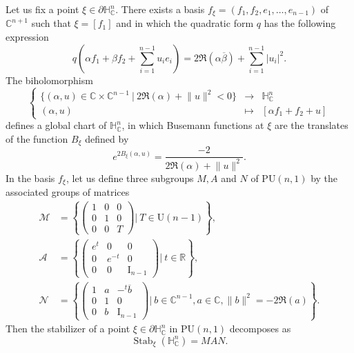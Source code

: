 \documentclass{article}
\theoremstyle{definition}
\theoremstyle{remark}
\newcommand{\C}{\mathbb{C}}
\newcommand{\R}{\mathbb{R}}
\newcommand{\HNC}{\mathbb{H}^{n}_{\C}}
\newcommand{\PHNC}{\partial\mathbb{H}^{n}_{\C}}
\newcommand{\PU}{\mathrm{PU}}
\begin{document}
	Let us fix a point $\xi\in\PHNC$. There exists a basis $f_{\xi}=(f_1,f_2,e_1,\dots,e_{n-1})$ of $\C^{n+1}$ such that $\xi=[f_1]$ and in which the quadratic form $q$ has the following expression\begin{equation*}
		q\left(\alpha f_1+\beta f_2+\sum_{i=1}^{n-1}u_ie_i\right) = 2\Re(\alpha\overline{\beta}) + \sum_{i=1}^{n-1}\lvert u_i\rvert^{2}.
	\end{equation*}
	The biholomorphism 
	\begin{equation*}
		\left\{\begin{array}{rcl}
			\{(\alpha,u)\in \C\times\C^{n-1}\ \vert \ 2\Re(\alpha)+\lVert u\rVert^{2}<0\} &\longrightarrow &\HNC\\
			(\alpha,u) &\longmapsto & [\alpha f_1+f_2+u]
		\end{array}	\right.
	\end{equation*}
	defines a global chart of $\HNC$, in which Busemann functions at $\xi$ are the translates of the function $B_{\xi}$ defined by
	\begin{equation*}
		e^{2B_{\xi}(\alpha,u)}=\frac{-2}{2\Re(\alpha)+\lVert u\rVert^{2}}.
	\end{equation*}
	In the basis $f_{\xi}$, let us define three subgroups $M,A$ and $N$ of $\PU(n,1)$ by the associated groups of matrices \begin{align*}
		\mathcal{M} &= \left\{\left(\begin{array}{ccc}
			1&0&0\\
			0&1&0\\
			0&0&T
		\end{array}\right)\lvert\ T\in \mathrm{U}(n-1)\right\}, \\
		\mathcal{A} &= \left\{\left(\begin{array}{ccc}
			e^{t}&0&0\\
			0&e^{-t}&0\\
			0&0&\mathrm{I}_{n-1}
		\end{array}\right)\lvert\ t\in \R\right\}, \\
		\mathcal{N} &=\left\{	\left(\begin{array}{ccc}
			1 & a & -{}^{t}\overline{b} \\
			0 & 1 & 0 \\
			0 & b & \mathrm{I}_{n-1}
		\end{array}\right)\lvert \ b\in \C^{n-1},a\in \C, \lVert b\rVert^{2} = -2\Re(a)\right\}.
	\end{align*}
	Then the stabilizer of a point $\xi\in \PHNC$ in $\PU(n,1)$ decomposes as\begin{equation*}
		\operatorname{Stab}_{\xi}(\HNC)= MAN.
	\end{equation*}
\end{document}
